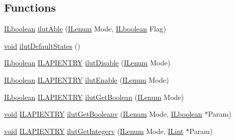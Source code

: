 \subsection*{Functions}
\begin{DoxyCompactItemize}
\item 
\hyperlink{group__il__types_gaa6aa7c95cfdc06b4d8601ef832b7bb0a}{I\+Lboolean} \hyperlink{group___i_l_u_t_gac41419bd41efde8faf04d7bd0d611fe9}{ilut\+Able} (\hyperlink{group__il__types_ga62ca73445716183ef42b1f3906a45ed0}{I\+Lenum} Mode, \hyperlink{group__il__types_gaa6aa7c95cfdc06b4d8601ef832b7bb0a}{I\+Lboolean} Flag)
\item 
\hyperlink{_i_l_8h_a5530e04d947bcddd83639ea7940faf10}{void} \hyperlink{group___i_l_u_t_ga65d71b2b7dbd1291881aa31270e65503}{ilut\+Default\+States} ()
\item 
\hyperlink{group__il__types_gaa6aa7c95cfdc06b4d8601ef832b7bb0a}{I\+Lboolean} \hyperlink{_i_l_8h_a69c08a8d06df986f7e46f209d131ef2f}{I\+L\+A\+P\+I\+E\+N\+T\+R\+Y} \hyperlink{group___i_l_u_t_ga9b3618f277929697ef64e1415abc4037}{ilut\+Disable} (\hyperlink{group__il__types_ga62ca73445716183ef42b1f3906a45ed0}{I\+Lenum} Mode)
\item 
\hyperlink{group__il__types_gaa6aa7c95cfdc06b4d8601ef832b7bb0a}{I\+Lboolean} \hyperlink{_i_l_8h_a69c08a8d06df986f7e46f209d131ef2f}{I\+L\+A\+P\+I\+E\+N\+T\+R\+Y} \hyperlink{group___i_l_u_t_ga0322d1780d69ecbb5301860f47f3650c}{ilut\+Enable} (\hyperlink{group__il__types_ga62ca73445716183ef42b1f3906a45ed0}{I\+Lenum} Mode)
\item 
\hyperlink{group__il__types_gaa6aa7c95cfdc06b4d8601ef832b7bb0a}{I\+Lboolean} \hyperlink{_i_l_8h_a69c08a8d06df986f7e46f209d131ef2f}{I\+L\+A\+P\+I\+E\+N\+T\+R\+Y} \hyperlink{group___i_l_u_t_ga9e6d98dde7a2546ec20249076f98f9b6}{ilut\+Get\+Boolean} (\hyperlink{group__il__types_ga62ca73445716183ef42b1f3906a45ed0}{I\+Lenum} Mode)
\item 
\hyperlink{_i_l_8h_a5530e04d947bcddd83639ea7940faf10}{void} \hyperlink{_i_l_8h_a69c08a8d06df986f7e46f209d131ef2f}{I\+L\+A\+P\+I\+E\+N\+T\+R\+Y} \hyperlink{group___i_l_u_t_ga01329d5f7dcbfe728e2249392e4c63fa}{ilut\+Get\+Booleanv} (\hyperlink{group__il__types_ga62ca73445716183ef42b1f3906a45ed0}{I\+Lenum} Mode, \hyperlink{group__il__types_gaa6aa7c95cfdc06b4d8601ef832b7bb0a}{I\+Lboolean} $\ast$Param)
\item 
\hyperlink{_i_l_8h_a5530e04d947bcddd83639ea7940faf10}{void} \hyperlink{_i_l_8h_a69c08a8d06df986f7e46f209d131ef2f}{I\+L\+A\+P\+I\+E\+N\+T\+R\+Y} \hyperlink{group___i_l_u_t_ga14266e0428a1c6a140b8868294e40504}{ilut\+Get\+Integerv} (\hyperlink{group__il__types_ga62ca73445716183ef42b1f3906a45ed0}{I\+Lenum} Mode, \hyperlink{group__il__types_ga8effe51a00daaa0878631e5af75a36cb}{I\+Lint} $\ast$Param)

\end{DoxyCompactItemize}
